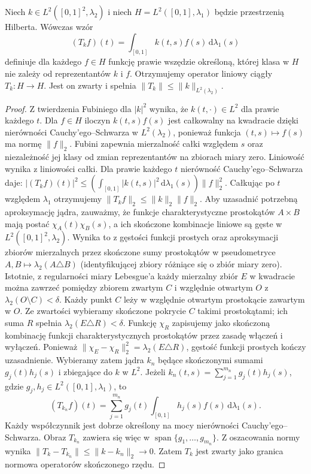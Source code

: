 \begin{twierdzenie}
\label{thm:hilbert-schmidt29}
Niech $k\in L^2([0,1]^2,\lambda_2)$ i niech
$H=L^2([0,1],\lambda_1)$ będzie przestrzenią Hilberta.
Wówczas wzór
\[
(T_kf)(t)=\int_{[0,1]}k(t,s)f(s)\,\mathrm d\lambda_1(s)
\]
definiuje dla każdego $f\in H$ funkcję prawie wszędzie
określoną, której klasa w $H$ nie zależy od reprezentantów
$k$ i $f$. Otrzymujemy operator liniowy ciągły $T_k:H\to H$. Jest on zwarty i spełnia
$\|T_k\|\le\|k\|_{L^2(\lambda_2)}$.
\end{twierdzenie}
\begin{proof}
Z twierdzenia Fubiniego dla $|k|^2$ wynika, że
$k(t,\cdot)\in L^2$ dla prawie każdego $t$. Dla $f\in H$
iloczyn $k(t,s)f(s)$ jest całkowalny na kwadracie dzięki
nierówności Cauchy'ego--Schwarza w $L^2(\lambda_2)$,
ponieważ funkcja $(t,s)\mapsto f(s)$ ma normę $\|f\|_2$.
Fubini zapewnia mierzalność całki względem $s$ oraz
niezależność jej klasy od zmian reprezentantów na zbiorach
miary zero. Liniowość wynika z liniowości całki.
Dla prawie każdego $t$ nierówność Cauchy'ego--Schwarza daje:
$|(T_kf)(t)|^2\le
(\int_{[0,1]}|k(t,s)|^2\,\mathrm d\lambda_1(s))\|f\|_2^2$.
Całkując po $t$ względem $\lambda_1$ otrzymujemy
$\|T_kf\|_2\le\|k\|_2\|f\|_2$.
Aby uzasadnić potrzebną aproksymację jądra, zauważmy, że
funkcje charakterystyczne prostokątów $A\times B$ mają postać
$\chi_A(t)\chi_B(s)$, a ich skończone kombinacje
liniowe są gęste w $L^2([0,1]^2,\lambda_2)$.
Wynika to z gęstości funkcji prostych oraz aproksymacji
zbiorów mierzalnych przez skończone sumy prostokątów
w pseudometryce $A,B\mapsto\lambda_2(A\triangle B)$
(identyfikującej zbiory różniące się o zbiór miary zero).
Istotnie, z regularności miary Lebesgue'a każdy mierzalny
zbiór $E$ w kwadracie można zawrzeć pomiędzy zbiorem
zwartym $C$ i względnie otwartym $O$ z
$\lambda_2(O\setminus C)<\delta$. Każdy punkt $C$ leży
w względnie otwartym prostokącie zawartym w $O$.
Ze zwartości wybieramy skończone pokrycie $C$ takimi
prostokątami; ich suma $R$ spełnia
$\lambda_2(E\triangle R)<\delta$.
Funkcję $\chi_R$ zapisujemy jako skończoną kombinację
funkcji charakterystycznych prostokątów przez zasadę
włączeń i wyłączeń. Ponieważ
$\|\chi_E-\chi_R\|_2^2=\lambda_2(E\triangle R)$,
gęstość funkcji prostych kończy uzasadnienie.
Wybieramy zatem jądra $k_n$ będące skończonymi sumami
$g_j(t)h_j(s)$ i zbiegające do $k$ w $L^2$.
Jeżeli $k_n(t,s)=\sum_{j=1}^{m_n}g_j(t)h_j(s)$,
gdzie $g_j,h_j\in L^2([0,1],\lambda_1)$, to
\[
(T_{k_n}f)(t)=\sum_{j=1}^{m_n}g_j(t)
\int_{[0,1]}h_j(s)f(s)\,\mathrm d\lambda_1(s).
\]
Każdy współczynnik jest dobrze określony na mocy nierówności
Cauchy'ego--Schwarza. Obraz $T_{k_n}$ zawiera się więc
w $\operatorname{span}\{g_1,\ldots,g_{m_n}\}$. Z oszacowania normy wynika
$\|T_k-T_{k_n}\|\le\|k-k_n\|_2\to0$.
Zatem $T_k$ jest zwarty jako granica normowa operatorów
skończonego rzędu.
\end{proof}


